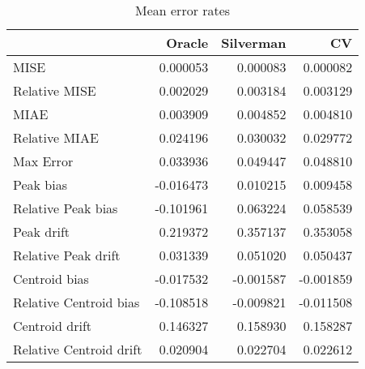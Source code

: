 \begin{table}[H]
\centering
\begin{tabular}{lrrr}
  \hline
 & Oracle & Silverman & CV \\ 
  \hline
MISE & 0.000053 & 0.000083 & 0.000082 \\ 
  Relative MISE & 0.002029 & 0.003184 & 0.003129 \\ 
  MIAE & 0.003909 & 0.004852 & 0.004810 \\ 
  Relative MIAE & 0.024196 & 0.030032 & 0.029772 \\ 
  Max Error & 0.033936 & 0.049447 & 0.048810 \\ 
  Peak bias & -0.016473 & 0.010215 & 0.009458 \\ 
  Relative Peak bias & -0.101961 & 0.063224 & 0.058539 \\ 
  Peak drift & 0.219372 & 0.357137 & 0.353058 \\ 
  Relative Peak drift & 0.031339 & 0.051020 & 0.050437 \\ 
  Centroid bias & -0.017532 & -0.001587 & -0.001859 \\ 
  Relative Centroid bias & -0.108518 & -0.009821 & -0.011508 \\ 
  Centroid drift & 0.146327 & 0.158930 & 0.158287 \\ 
  Relative Centroid drift & 0.020904 & 0.022704 & 0.022612 \\ 
   \hline
\end{tabular}
\caption{Mean error rates} 
\label{tbl:mean_error_rates}
\end{table}
